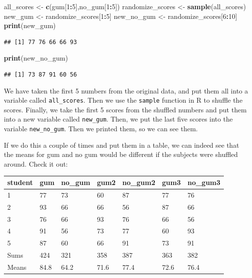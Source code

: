 \documentclass[
]{book}
\newenvironment{Shaded}{\begin{snugshade}}{\end{snugshade}}
\newcommand{\DecValTok}[1]{\textcolor[rgb]{0.00,0.00,0.81}{#1}}
\newcommand{\FunctionTok}[1]{\textcolor[rgb]{0.13,0.29,0.53}{\textbf{#1}}}
\newcommand{\NormalTok}[1]{#1}
\newcommand{\OtherTok}[1]{\textcolor[rgb]{0.56,0.35,0.01}{#1}}
\newcommand{\SpecialCharTok}[1]{\textcolor[rgb]{0.81,0.36,0.00}{\textbf{#1}}}
\begin{document}
\begin{Shaded}
\begin{Highlighting}[]
\NormalTok{all\_scores       }\OtherTok{\textless{}{-}} \FunctionTok{c}\NormalTok{(gum[}\DecValTok{1}\SpecialCharTok{:}\DecValTok{5}\NormalTok{],no\_gum[}\DecValTok{1}\SpecialCharTok{:}\DecValTok{5}\NormalTok{])}
\NormalTok{randomize\_scores }\OtherTok{\textless{}{-}} \FunctionTok{sample}\NormalTok{(all\_scores)}
\NormalTok{new\_gum          }\OtherTok{\textless{}{-}}\NormalTok{ randomize\_scores[}\DecValTok{1}\SpecialCharTok{:}\DecValTok{5}\NormalTok{]}
\NormalTok{new\_no\_gum       }\OtherTok{\textless{}{-}}\NormalTok{ randomize\_scores[}\DecValTok{6}\SpecialCharTok{:}\DecValTok{10}\NormalTok{]}
\FunctionTok{print}\NormalTok{(new\_gum)}
\end{Highlighting}
\end{Shaded}

\begin{verbatim}
## [1] 77 76 66 66 93
\end{verbatim}

\begin{Shaded}
\begin{Highlighting}[]
\FunctionTok{print}\NormalTok{(new\_no\_gum)}
\end{Highlighting}
\end{Shaded}

\begin{verbatim}
## [1] 73 87 91 60 56
\end{verbatim}

We have taken the first 5 numbers from the original data, and put them all into a variable called \texttt{all\_scores}. Then we use the \texttt{sample} function in R to shuffle the scores. Finally, we take the first 5 scores from the shuffled numbers and put them into a new variable called \texttt{new\_gum}. Then, we put the last five scores into the variable \texttt{new\_no\_gum}. Then we printed them, so we can see them.

If we do this a couple of times and put them in a table, we can indeed see that the means for gum and no gum would be different if the subjects were shuffled around. Check it out:

\begin{tabular}{l|l|l|l|l|l|l}
\hline
student & gum & no\_gum & gum2 & no\_gum2 & gum3 & no\_gum3\\
\hline
1 & 77 & 73 & 60 & 87 & 77 & 76\\
\hline
2 & 93 & 66 & 66 & 56 & 87 & 66\\
\hline
3 & 76 & 66 & 93 & 76 & 66 & 56\\
\hline
4 & 91 & 56 & 73 & 77 & 60 & 93\\
\hline
5 & 87 & 60 & 66 & 91 & 73 & 91\\
\hline
Sums & 424 & 321 & 358 & 387 & 363 & 382\\
\hline
Means & 84.8 & 64.2 & 71.6 & 77.4 & 72.6 & 76.4\\
\hline
\end{tabular}
\end{document}
